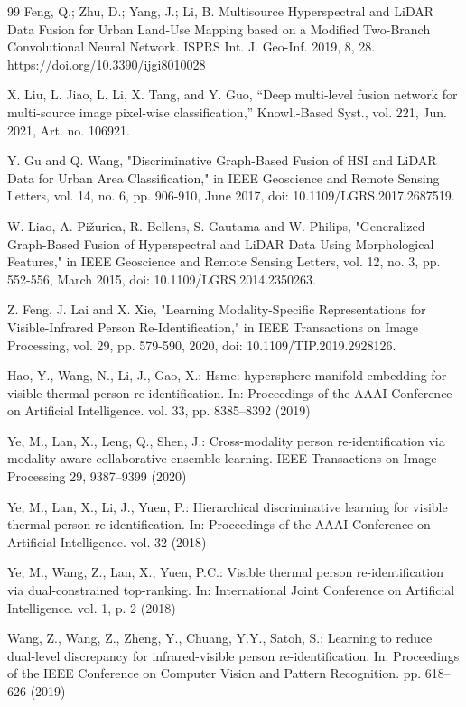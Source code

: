 \documentclass[UTF8,zihao=-4]{oucart}
\begin{document}
\begin{thebibliography}{99}
    Feng, Q.; Zhu, D.; Yang, J.; Li, B. Multisource Hyperspectral and LiDAR Data Fusion for Urban Land-Use Mapping based on a Modified Two-Branch Convolutional Neural Network. ISPRS Int. J. Geo-Inf. 2019, 8, 28. https://doi.org/10.3390/ijgi8010028

    X. Liu, L. Jiao, L. Li, X. Tang, and Y. Guo, “Deep multi-level fusion network for multi-source image pixel-wise classification,” Knowl.-Based Syst., vol. 221, Jun. 2021, Art. no. 106921.

    Y. Gu and Q. Wang, "Discriminative Graph-Based Fusion of HSI and LiDAR Data for Urban Area Classification," in IEEE Geoscience and Remote Sensing Letters, vol. 14, no. 6, pp. 906-910, June 2017, doi: 10.1109/LGRS.2017.2687519.

    W. Liao, A. Pižurica, R. Bellens, S. Gautama and W. Philips, "Generalized Graph-Based Fusion of Hyperspectral and LiDAR Data Using Morphological Features," in IEEE Geoscience and Remote Sensing Letters, vol. 12, no. 3, pp. 552-556, March 2015, doi: 10.1109/LGRS.2014.2350263.

    Z. Feng, J. Lai and X. Xie, "Learning Modality-Specific Representations for Visible-Infrared Person Re-Identification," in IEEE Transactions on Image Processing, vol. 29, pp. 579-590, 2020, doi: 10.1109/TIP.2019.2928126.

    Hao, Y., Wang, N., Li, J., Gao, X.: Hsme: hypersphere manifold embedding for visible thermal person re-identification. In: Proceedings of the AAAI Conference on Artificial Intelligence. vol. 33, pp. 8385–8392 (2019)

    Ye, M., Lan, X., Leng, Q., Shen, J.: Cross-modality person re-identification via modality-aware collaborative ensemble learning. IEEE Transactions on Image Processing 29, 9387–9399 (2020)

    Ye, M., Lan, X., Li, J., Yuen, P.: Hierarchical discriminative learning for visible thermal person re-identification. In: Proceedings of the AAAI Conference on Artificial Intelligence. vol. 32 (2018)

    Ye, M., Wang, Z., Lan, X., Yuen, P.C.: Visible thermal person re-identification via dual-constrained top-ranking. In: International Joint Conference on Artificial Intelligence. vol. 1, p. 2 (2018)

    Wang, Z., Wang, Z., Zheng, Y., Chuang, Y.Y., Satoh, S.: Learning to reduce dual-level discrepancy for infrared-visible person re-identification. In: Proceedings of the IEEE Conference on Computer Vision and Pattern Recognition. pp. 618–626 (2019)


\end{thebibliography}
\end{document}
